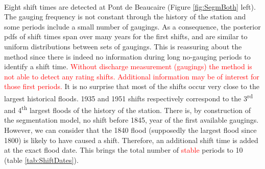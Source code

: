 \documentclass[11pt]{article}
\begin{document}
    \paragraph{}
    Eight shift times are detected at Pont de Beaucaire (Figure \ref{fig:SegmBoth} left). The gauging frequency is not constant through the history of the station and some periods include a small number of gaugings. As a consequence, the posterior pdfs of shift times span over many years for the first shifts, and are similar to uniform distributions between sets of gaugings. This is reassuring about the method since there is indeed no information during long no-gauging periods to identify a shift time. \textcolor{red}{Without discharge measurement (gaugings) the method is not able to detect any rating shifts. Additional information may be of interest for those first periods.} It is no surprise that most of the shifts occur very close to the largest historical floods. 1935 and 1951 shifts respectively correspond to the 3\textsuperscript{rd} and 4\textsuperscript{th} largest floods of the history of the station. There is, by construction of the segmentation model, no shift before 1845, year of the first available gaugings. However, we can consider that the 1840 flood (supposedly the largest flood since 1800) is likely to have caused a shift. Therefore, an additional shift time is added at the exact flood date. This brings the total number of \textcolor{red}{stable} periods to 10 (table \ref{tab:ShiftDates}). 
    
\end{document}
